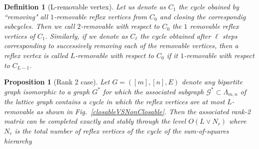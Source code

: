 \documentclass[12pt]{article}
\newtheorem{proposition}{Proposition}
\newtheorem{definition}{Definition}
\begin{document}
\begin{definition}[L-removable vertex]
Let us denote as $C_1$ the cycle obained by ``removing" all $1$-removable reflex vertices from $C_0$ and closing the correspondig subcycles. Then we call $2$-removable with respect to $C_0$ the $1$ removable reflex vertices of $C_1$. Similarly, if we denote as $C_\ell$ the cycle obtained after $\ell$ steps corresponding to successively removing each of the removable vertices, then a reflex vertex is called $L$-removable with respect to $C_0$ if it $1$-removable with respect to $C_{L-1}$.  
\end{definition}

\begin{proposition}[\label{propositionCycleSelfAvoiding01}Rank 2 case]
Let $G = ([m], [n],E)$ denote any bipartite graph isomorphic to a graph $G^*$ for which the associated subgraph $\mathcal{G}^*\subset \Lambda_{m,n}$  of the lattice graph contains a cycle in which the reflex vertices are at most \emph{$L$-removable} as shown in Fig.~\ref{closableVSNonClosable}. Then the associated rank-2 matrix can be completed exactly and stably through the level $O(L\vee N_r)$ where $N_r$ is the total number of reflex vertices of the cycle of the sum-of-squares hierarchy
\end{proposition}
\end{document}
